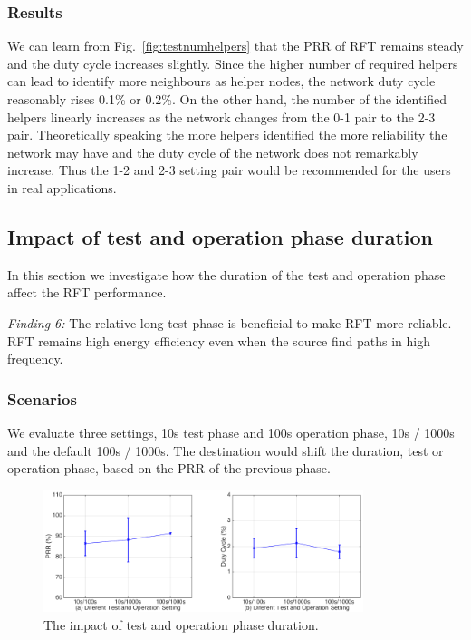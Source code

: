 \documentclass[conference]{IEEEtran}
\begin{document}
\subsubsection{Results}
We can learn from Fig.~\ref{fig:testnumhelpers} that the PRR of RFT remains steady and the duty cycle increases slightly. Since the higher number of required helpers can lead to identify more neighbours as helper nodes, the network duty cycle reasonably rises 0.1\% or 0.2\%. On the other hand, the number of the identified helpers linearly increases as the network changes from the 0-1 pair to the 2-3 pair. Theoretically speaking the more helpers identified the more reliability the network may have and the duty cycle of the network does not remarkably increase. Thus the 1-2 and 2-3 setting pair would be recommended for the users in real applications. 

\subsection{Impact of test and operation phase duration}
\label{sec:testphase&operationphase}
In this section we investigate how the duration of the test and operation phase affect the RFT performance. 

\emph{Finding 6:} 
The relative long test phase is beneficial to make RFT more reliable. RFT remains high energy efficiency even when the source find paths in high frequency.
\subsubsection{Scenarios}
We evaluate three settings, 10s test phase and 100s operation phase, 10s / 1000s and the default 100s / 1000s. The destination would shift the duration, test or operation phase, based on the PRR of the previous phase.
\begin{figure}
\centering
\includegraphics[height=3.55cm]{errorbar_testphase3.png}
\caption{The impact of test and operation phase duration.}
\label{fig:testphaseduration}
\end{figure}
\end{document}
